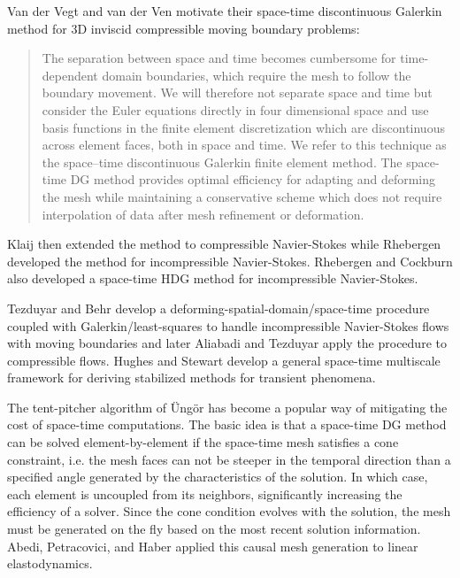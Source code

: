 \documentclass[Proposal.tex]{subfiles}
\begin{document}
Van der Vegt and van der Ven\cite{vanderVegtEuler} motivate their space-time discontinuous Galerkin method 
for 3D inviscid compressible moving boundary problems:
\begin{quotation}
The separation between space and time becomes cumbersome for time-dependent domain
boundaries, which require the mesh to follow the boundary movement. We will therefore
not separate space and time but consider the Euler equations directly in four dimensional
space and use basis functions in the finite element discretization which are discontinuous
across element faces, both in space and time.
We refer to this technique as the space–time discontinuous Galerkin finite element method.
The space-time DG method provides optimal efficiency for adapting and deforming the mesh while maintaining a conservative scheme which
does not require interpolation of data after mesh refinement or deformation.
\end{quotation}
Klaij \etal\cite{KlaijCompressible} then extended the method to compressible Navier-Stokes while Rhebergen \etal\cite{Rhebergen2013}
developed the method for incompressible Navier-Stokes.
Rhebergen and Cockburn\cite{RhebergenHDG} also developed a space-time HDG method for incompressible Navier-Stokes.

Tezduyar and Behr\cite{Tezduyar1992} develop a deforming-spatial-domain/space-time procedure coupled with Galerkin/least-squares 
to handle incompressible Navier-Stokes flows
with moving boundaries and later Aliabadi and Tezduyar\cite{Aliabadi1993} apply the procedure to compressible flows.
Hughes and Stewart\cite{HughesSpaceTime} develop a general space-time multiscale framework for deriving stabilized methods for
transient phenomena.

The tent-pitcher algorithm of {\"U}ng{\"o}r\cite{TentPitcher} has become a popular way of mitigating the cost of space-time computations.
The basic idea is that a space-time DG method can be solved element-by-element if the space-time mesh satisfies a cone constraint, i.e.
the mesh faces can not be steeper in the temporal direction than a specified angle generated by the characteristics of the solution.
In which case, each element is uncoupled from its neighbors, significantly increasing the efficiency of a solver. 
Since the cone condition evolves with the solution, the mesh must be generated on the fly based on the most recent solution information.
Abedi, Petracovici, and Haber\cite{Abedi2006} applied this causal mesh generation to linear elastodynamics.
\end{document}

